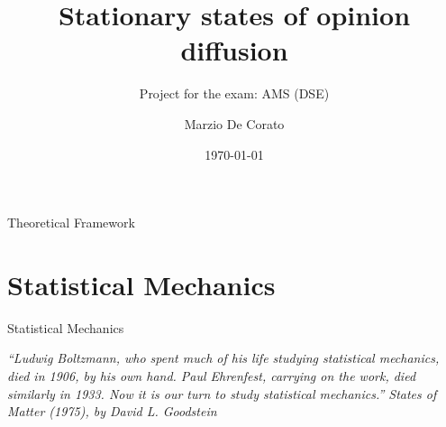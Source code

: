 \documentclass{beamer}
\title[AMS project]{ Stationary states of opinion diffusion}
\subtitle{Project for the exam: AMS (DSE)}
\author{Marzio De Corato }
\date{\today}
\begin{document}
\begin{frame}
\vspace{+4 cm}  \titlepage
\end{frame}

\usebackgroundtemplate{ } 






\begin{frame}{}
\begin{center}
{\Huge Theoretical Framework}
\end{center}
\end{frame}


\section{Statistical Mechanics}

\begin{frame}{}
\begin{center}
{\Huge Statistical Mechanics}
\end{center}
\begin{center}
\textit{“Ludwig Boltzmann, who spent much of his life studying statistical mechanics, died in 1906, by his own hand. Paul Ehrenfest, carrying on the work, died similarly in 1933. Now it is our turn to study statistical mechanics.” States of Matter (1975), by David L. Goodstein}
\end{center}
\end{frame}
\end{document}
